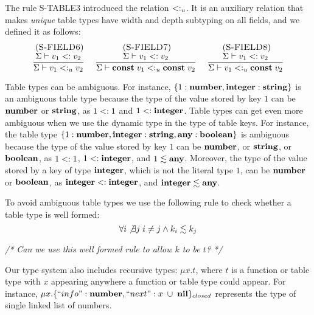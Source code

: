 The rule \textsc{S-TABLE3} introduced the relation $<:_{u}$.
It is an auxiliary relation that makes \emph{unique} table types
have width and depth subtyping on all fields, and we defined it
as follows:
\[
\begin{array}{c}
\begin{array}{c}
\; (\textsc{S-FIELD6})\\
\dfrac{\Sigma \vdash v_{1} <: v_{2}}
      {\Sigma \vdash v_{1} <:_{u} v_{2}}
\end{array}
\;
\begin{array}{c}
\; (\textsc{S-FIELD7})\\
\dfrac{\Sigma \vdash v_{1} <: v_{2}}
      {\Sigma \vdash \mathbf{const} \; v_{1} <:_{u} \mathbf{const} \; v_{2}}
\end{array}
\;
\begin{array}{c}
\; (\textsc{S-FIELD8})\\
\dfrac{\Sigma \vdash v_{1} <: v_{2}}
      {\Sigma \vdash v_{1} <:_{u} \mathbf{const} \; v_{2}}
\end{array}
\end{array}
\]

Table types can be ambiguous.
For instance, $\{1:\mathbf{number}, \mathbf{integer}:\mathbf{string}\}$ is an ambiguous
table type because the type of the value stored by key $1$ can be
$\mathbf{number}$ or $\mathbf{string}$, as $1 <: 1$ and
$1 <: \mathbf{integer}$.
Table types can get even more ambiguous when we use the dynamic
type in the type of table keys.
For instance, the table type $\{1:\mathbf{number}, \mathbf{integer}:\mathbf{string}, \mathbf{any}:\mathbf{boolean}\}$
is ambiguous because the type of the value stored by key $1$ can be
$\mathbf{number}$, or $\mathbf{string}$, or $\mathbf{boolean}$, as $1 <: 1$,
$1 <: \mathbf{integer}$, and $1 \lesssim \mathbf{any}$.
Moreover, the type of the value stored by a key of type $\mathbf{integer}$,
which is not the literal type $1$, can be $\mathbf{number}$ or $\mathbf{boolean}$,
as $\mathbf{integer} <: \mathbf{integer}$, and $\mathbf{integer} \lesssim \mathbf{any}$.

To avoid ambiguous table types we use the following rule to check
whether a table type is well formed:
\[
\forall i \not\exists j \; i \not= j \wedge k_{i} \lesssim k_{j}
\]

\emph{/* Can we use this well formed rule to allow $k$ to be $t$? */}

Our type system also includes recursive types: $\mu x.t$,
where $t$ is a function or table type with $x$ appearing anywhere
a function or table type could appear.
For instance, $\mu x.\{``info":\mathbf{number}, ``next":x \;\cup\; \mathbf{nil}\}_{closed}$
represents the type of single linked list of numbers.

